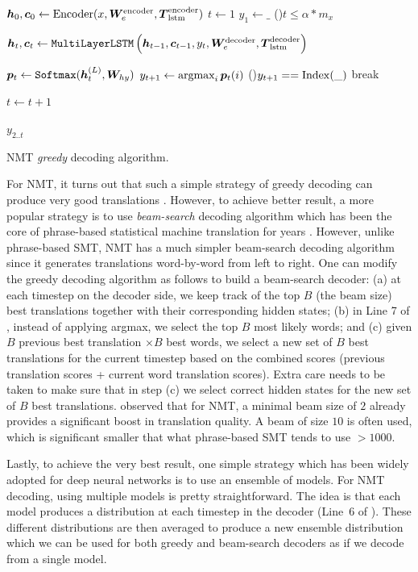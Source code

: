 \begin{algorithm}
$\bm{h}_{0}, \bm{c}_{0} \leftarrow \text{Encoder}(x, \bm{W}_{e}^{\text{encoder}}, \mbox{\boldmath{$T$}}_{\text{lstm}}^{\text{encoder}})$ \;
$t \leftarrow 1$ \;
$y_1 \leftarrow \_$ \;
\While(){$t \leq \alpha * m_x$} {
  $\bm{h}_{t}, \bm{c}_{t} \leftarrow \text{\texttt{MultiLayerLSTM}}\left(\bm{h}_{t-1},
  \bm{c}_{t-1}, y_t, \bm{W}_{e}^{\text{decoder}}, \mbox{\boldmath{$T$}}_{\text{lstm}}^{\text{decoder}}\right)$ \;

  $\bm{p}_{t} \leftarrow \text{\texttt{Softmax}}(\bm{h}_{t}^{(L)},\bm{W}_{hy})$ \;
  $y_{t+1} \leftarrow \mathop{\text{argmax}}_i \bm{p}_{t}(i)$ 
  \If(){$y_{t+1} == \operatorname{Index}(\_)$} {
    break\;
  }

  $t \leftarrow t+1$
}
\Return $y_{2..t}$

\caption{NMT {\it greedy} decoding algorithm.}
\label{a:nmt_greedy}
\end{algorithm}


For NMT, it turns out that such a simple strategy of greedy decoding can produce
very good translations \cite{sutskever14}. However, to achieve better result,
a more popular strategy is to use {\it beam-search} decoding algorithm which has been the
core of phrase-based statistical machine translation for years \cite{Koehn:2003:SMT}.
However, unlike phrase-based SMT, NMT has a much simpler beam-search decoding algorithm
since it generates translations word-by-word from left to right. One can modify
the greedy decoding algorithm as follows to build a beam-search decoder: (a) at
each timestep on the decoder side, we keep track of the top $B$ (the beam size) best
translations together with their corresponding hidden states; (b) in Line 7 of
, instead of applying argmax, we select the top $B$ most
likely words; and (c) given $B$ previous best translation $\times B$ best words, we
select a new set of $B$ best translations for the current timestep based on the
combined scores (previous translation scores + current word translation scores).
Extra care needs to be taken to make sure that in step (c) we select correct
hidden states for the new set of $B$ best translations. 
observed that for NMT, a minimal beam size of $2$ already provides a significant
boost in translation quality. A beam of size $10$ is often used, which is
significant smaller that what phrase-based SMT tends to use $> 1000$.

Lastly, to achieve the very best result, one simple strategy which has been
widely adopted for deep neural networks is to use an ensemble of models. For NMT
decoding, using multiple models is pretty straightforward. The idea is that each
model produces a distribution at each timestep in the decoder (Line~6 of
). These different distributions are then averaged to produce
a new ensemble distribution which we can be used for both greedy and beam-search
decoders as if we decode from a single model.
